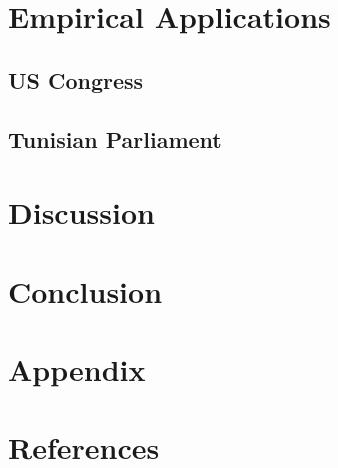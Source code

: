 	\section*{Empirical Applications}
	
	\subsection*{US Congress}
	
	\subsection*{Tunisian Parliament}
	
	\section*{Discussion}
	
	\section*{Conclusion}
	
	\section*{Appendix}
	
	\section*{References}
	
	
	
